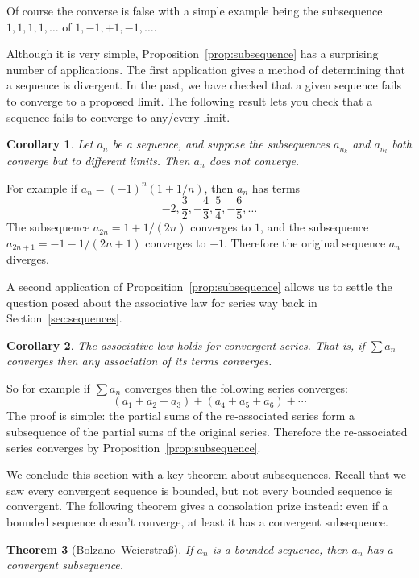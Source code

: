 \documentclass[11pt,oneside]{amsbook}
\theoremstyle{definition}
\theoremstyle{plain}
\newtheorem{thm}{Theorem}[section]
\newtheorem{cor}[thm]{Corollary}
\theoremstyle{definition}
\theoremstyle{remark}
\numberwithin{equation}{section}
\numberwithin{figure}{section}
\begin{document}
Of course the converse is false with a simple example being the subsequence $1,1,1,1,\ldots$ of $1,-1,+1,-1,\ldots$.

Although it is very simple, Proposition~\ref{prop:subsequence} has a surprising number of applications. The first application gives a method of determining that a sequence is divergent. In the past, we have checked that a given sequence fails to converge to a proposed limit. The following result lets you check that a sequence fails to converge to any/every limit.

\begin{cor}
  \label{cor:divergence}
  Let $a_n$ be a sequence, and suppose the subsequences $a_{n_k}$ and $a_{n_l}$ both converge but to different limits. Then $a_n$ does not converge.
\end{cor}

For example if $a_n=(-1)^n(1+1/n)$, then $a_n$ has terms
\[-2,\frac32,-\frac{4}{3},\frac54,-\frac{6}{5},\ldots
\]
The subsequence $a_{2n}=1+1/(2n)$ converges to $1$, and the subsequence $a_{2n+1}=-1-1/(2n+1)$ converges to $-1$. Therefore the original sequence $a_n$ diverges.

A second application of Proposition~\ref{prop:subsequence} allows us to settle the question posed about the associative law for series way back in Section~\ref{sec:sequences}.

\begin{cor}
  The associative law holds for convergent series. That is, if $\sum a_n$ converges then any association of its terms converges.
\end{cor}

So for example if $\sum a_n$ converges then the following series converges:
\[(a_1+a_2+a_3)+(a_4+a_5+a_6)+\cdots
\]
The proof is simple: the partial sums of the re-associated series form a subsequence of the partial sums of the original series. Therefore the re-associated series converges by Proposition~\ref{prop:subsequence}.

We conclude this section with a key theorem about subsequences. Recall that we saw every convergent sequence is bounded, but not every bounded sequence is convergent. The following theorem gives a consolation prize instead: even if a bounded sequence doesn't converge, at least it has a convergent subsequence.

\begin{thm}[Bolzano--Weierstra\ss]
  If $a_n$ is a bounded sequence, then $a_n$ has a convergent subsequence.
\end{thm}
\end{document}
